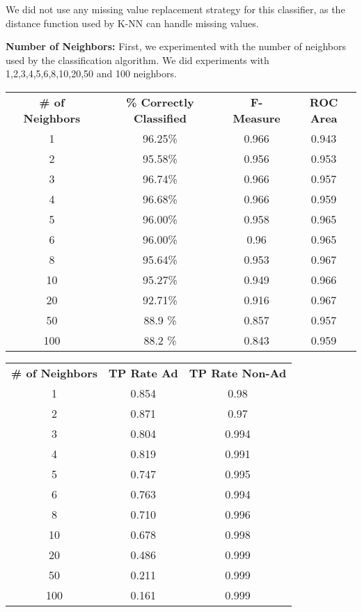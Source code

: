 \documentclass{article}
\begin{document}
We did not use any missing value replacement strategy for this classifier, as the distance function used by K-NN can handle missing values. 

\textbf{Number of Neighbors:}
First, we experimented with the number of neighbors used by the classification algorithm. We did experiments with 1,2,3,4,5,6,8,10,20,50 and 100 neighbors.

\begin{center}
\begin{tabular}{ c | c | c | c}
\textbf{\# of Neighbors} & \textbf{\% Correctly Classified} & \textbf{F-Measure} & \textbf{ROC Area}\\
1   & 96.25\% & 0.966 & 0.943\\
2   & 95.58\% & 0.956 & 0.953\\
3   & 96.74\% & 0.966 & 0.957\\
4   & 96.68\% & 0.966 & 0.959\\
5   & 96.00\% & 0.958 & 0.965\\
6   & 96.00\% & 0.96  & 0.965\\
8   & 95.64\% & 0.953 & 0.967\\
10  & 95.27\% & 0.949 & 0.966\\
20  & 92.71\% & 0.916 & 0.967\\
50  & 88.9 \% & 0.857 & 0.957\\
100 & 88.2 \% & 0.843 & 0.959\\
\end{tabular}
\end{center}

\begin{center}
\begin{tabular}{ c | c | c}
\textbf{\# of Neighbors} & \textbf{TP Rate Ad} & \textbf{TP Rate Non-Ad}\\
1   & 0.854 & 0.98\\
2   & 0.871 & 0.97\\
3   & 0.804 & 0.994\\
4   & 0.819 & 0.991\\
5   & 0.747 & 0.995\\
6   & 0.763 & 0.994\\
8   & 0.710 & 0.996\\
10  & 0.678 & 0.998\\
20  & 0.486 & 0.999\\
50  & 0.211 & 0.999\\
100 & 0.161 & 0.999\\
\end{tabular}
\end{center}
\end{document}
